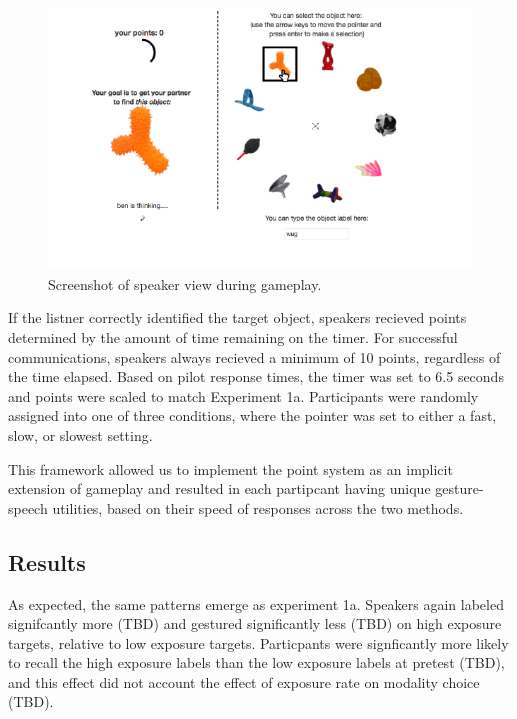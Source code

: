 \documentclass[10pt, letterpaper]{article}
\newenvironment{CodeChunk}{}{}
\begin{document}
\begin{CodeChunk}
\begin{figure}[H]

{\centering \includegraphics{figs/image-1} 

}

\caption[Screenshot of speaker view during gameplay]{Screenshot of speaker view during gameplay.}\label{fig:image}
\end{figure}
\end{CodeChunk}

If the listner correctly identified the target object, speakers recieved
points determined by the amount of time remaining on the timer. For
successful communications, speakers always recieved a minimum of 10
points, regardless of the time elapsed. Based on pilot response times,
the timer was set to 6.5 seconds and points were scaled to match
Experiment 1a. Participants were randomly assigned into one of three
conditions, where the pointer was set to either a fast, slow, or slowest
setting.

This framework allowed us to implement the point system as an implicit
extension of gameplay and resulted in each partipcant having unique
gesture-speech utilities, based on their speed of responses across the
two methods.

\subsection{Results}\label{results-1}

As expected, the same patterns emerge as experiment 1a. Speakers again
labeled signifcantly more (TBD) and gestured significantly less (TBD) on
high exposure targets, relative to low exposure targets. Particpants
were signficantly more likely to recall the high exposure labels than
the low exposure labels at pretest (TBD), and this effect did not
account the effect of exposure rate on modality choice (TBD).
\end{document}
